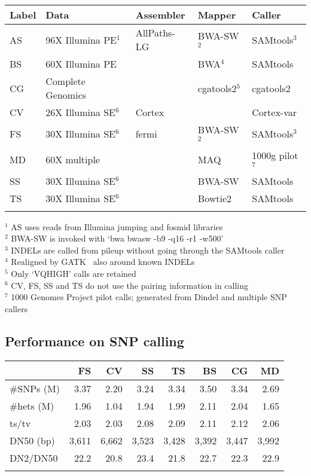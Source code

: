 \documentclass{bioinfo}
\begin{document}
\begin{table}[!htb]
{\begin{tabular}{lllll}
\toprule
Label & Data & Assembler & Mapper & Caller \\
\midrule
AS & 96X Illumina PE$^1$ & AllPaths-LG & BWA-SW$^2$ & SAMtools$^3$ \\
BS & 60X Illumina PE & & BWA$^4$ & SAMtools \\
CG & Complete Genomics& & cgatools2$^5$ & cgatools2 \\
CV & 26X Illumina SE$^6$ & Cortex & & Cortex-var \\
FS & 30X Illumina SE$^6$ & fermi & BWA-SW$^2$ & SAMtools$^3$ \\
MD & 60X multiple        & & MAQ & 1000g pilot$^7$ \\
SS & 30X Illumina SE$^6$ & & BWA-SW & SAMtools \\
TS & 30X Illumina SE$^6$ & & Bowtie2 & SAMtools \\
\botrule
\end{tabular}}{
$^1$ AS uses reads from Illumina jumping and fosmid libraries\\
$^2$ BWA-SW is invoked with `bwa bwasw -b9 -q16 -r1 -w500'\\
$^3$ INDELs are called from pileup without going through the SAMtools caller\\
$^4$ Realigned by GATK~\citep{Depristo:2011vn} also around known INDELs\\
$^5$ Only `VQHIGH' calls are retained\\
$^6$ CV, FS, SS and TS do not use the pairing information in calling\\
$^7$ 1000 Genomes Project pilot calls; generated from Dindel and multiple SNP callers\\
}
\end{table}

\subsection{Performance on SNP calling}

\begin{table}[!htb]
{\begin{tabular}{p{1.5cm}rrrrrrr}
\toprule
& FS & CV & SS & TS & BS & CG & MD \\
\midrule
\#SNPs (M) & 3.37 & 2.20 & 3.24 & 3.34 & 3.50 & 3.34 & 2.69\\
\#hets (M) & 1.96 & 1.04 & 1.94 & 1.99 & 2.11 & 2.04 & 1.65\\
ts/tv      & 2.03 & 2.03 & 2.08 & 2.09 & 2.11 & 2.12 & 2.06\\
DN50 (bp)  & 3,611& 6,662& 3,523& 3,428& 3,392& 3,447&3,992\\
DN2/DN50   & 22.2 & 20.8 & 23.4 & 21.8 & 22.7 & 22.3 & 22.9\\
\botrule
\end{tabular}}{}
\end{table}
\end{document}
